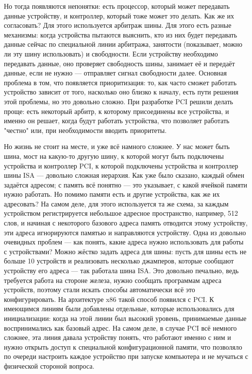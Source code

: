 \documentclass[main.tex]{subfiles}
\begin{document}
Но тогда появляются непонятки: есть процессор, который может
передавать данные устройству, и контроллер, который тоже может это делать.
Как же их согласовать? Для этого используется арбитраж шины.
Для этого есть разные механизмы: когда устройства пытаются выяснить,
кто из них будет передавать данные сейчас по специальной линии арбитража,
занятости (показывает, можно ли эту шину использовать) и свободности.
Если устройству необходимо передавать данные, оно проверяет свободность
шины, занимает её и передаёт данные, если не нужно --- отправляет
сигнал свободности далее. Основная проблема в том, что появляется
приоритизация: то, как часто сможет работать устройство зависит от того,
насколько оно близко к началу, есть пути решения этой проблемы, но это
довольно сложно. При разработке PCI решили делать проще:
есть некоторый арбитр, к которому присоединены все устройства,
и именно он решает, когда будут работать устройства, что позволяет
работать "честно" или, при необходимости вводить приоритеты.

Но жизнь не стоит на месте, и уже всё намного сложнее. У нас может
быть шина, мост на какую-то другую шину, к которой могут быть
подключены устройства и контроллер PCI, к которой подключены
устройства и контроллер шины ISA --- довольно сложная иерархия.
Как уже было сказано, каждый обмен задаётся адресом; с память всё понятно ---
это указывает, с какой ячейкой памяти нужно работать. Но помимо памяти есть и
другие устройства, как же их адресовать? На самом деле, для этого используется
та же схема, за каждым устройством регистрируется небольшое адресное
пространство, например, 512 слов, и начиная с некоторого базового адреса
память отводится этому устройству, эти адреса игнорируются памятью
и направляются устройству. Одна из довольно очевидных проблем ---
как понять, какие адреса нужно использовать для работы с устройствами?
Можно жёстко задать адреса для шины: пусть для шины есть не больше 10 устройств
и реализовать несколько джамперов, которые сообщают устройству его
адреса --- так работала шина ISA. Это довольно печально, ведь требуется
работа на стороне железа, нужно сообщать программам адреса устройств,
поэтому стали искать способы автоматически всё это конфигурировать.
На архитектуре x86 такой способ появился с PCI.
К имеющимся линиям были добавлены отдельные, которые использовались для
инициализации: когда на этой линии был высокий уровень, принимаемые данные
воспринимались как базовый адрес. На самом деле, в случае PCI всё немного
сложнее, эта линия давала устройству понять, что работают именно с ним и
нужно открыть доступ к специальной конфигурационной памяти, что позволяло
по очереди настроить каждое устройство при запуске компьютера и не мучаться
с физической стороной вопроса.
\end{document}

